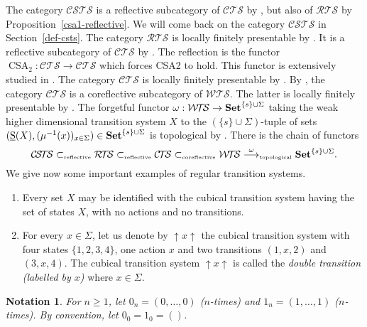 \documentclass[a4paper,12pt]{amsart}
\newtheorem{nota}[thm]{Notation}
\begin{document}
The category ${\mathcal{C\!S\!T\!S}}$ is a reflective subcategory of ${\mathcal{C\!T\!S}}$ by
\cite[Proposition~7.2]{cubicalhdts}, but also of ${\mathcal{R\!T\!S}}$ by
Proposition~\ref{csa1-reflective}. We will come back on the category
${\mathcal{C\!S\!T\!S}}$ in Section~\ref{def-csts}. The category ${\mathcal{R\!T\!S}}$ is locally
finitely presentable by \cite[Proposition~4.5]{csts}. It is a
reflective subcategory of ${\mathcal{C\!T\!S}}$ by \cite[Proposition~4.4]{csts}. The
reflection is the functor $\operatorname{CSA}_2:{\mathcal{C\!T\!S}}\to {\mathcal{C\!T\!S}}$ which forces CSA2 to
hold. This functor is extensively studied in
\cite[Section~4]{csts}. The category ${\mathcal{C\!T\!S}}$ is locally finitely
presentable by \cite[Corollary~3.15]{cubicalhdts}. By
\cite[Corollary~3.15]{cubicalhdts}, the category ${\mathcal{C\!T\!S}}$ is a
coreflective subcategory of ${\mathcal{W\!T\!S}}$. The latter is locally finitely
presentable by \cite[Theorem~3.4]{hdts}. The forgetful functor
$\omega:{\mathcal{W\!T\!S}} \to {{{\rm{\mathbf{{Set}}}}}}^{\{s\}\cup \Sigma}$ taking the weak higher
dimensional transition system $X$ to the $(\{s\}\cup \Sigma)$-tuple of
sets $(\operatorname{\underline{S}}(X),(\mu^{-1}(x))_{x\in \Sigma}) \in {{{\rm{\mathbf{{Set}}}}}}^{\{s\}\cup
  \Sigma}$ is topological by \cite[Theorem~3.4]{hdts}.  There is the
chain of functors
\[{\mathcal{C\!S\!T\!S}} \subset_{\hbox{\tiny reflective}} {\mathcal{R\!T\!S}} \subset_{\hbox{\tiny reflective}} {\mathcal{C\!T\!S}} \subset_{\hbox{\tiny coreflective}} {\mathcal{W\!T\!S}} \stackrel{\omega}\longrightarrow_{\hbox{\tiny topological}} {{{\rm{\mathbf{{Set}}}}}}^{\{s\}\cup \Sigma}.\]
We give now some important examples of regular transition systems.

\begin{enumerate}
\item Every set $X$ may be identified with the cubical transition
  system having the set of states $X$, with no actions and no
  transitions.
\item For every $x\in \Sigma$, let us denote by ${\uparrow\!\!{{x}}\!\!\uparrow}$ the cubical
  transition system with four states $\{1,2,3,4\}$, one action $x$ and
  two transitions $(1,x,2)$ and $(3,x,4)$. The cubical transition
  system ${\uparrow\!\!{{x}}\!\!\uparrow}$ is called the \emph{double transition (labelled by
    $x$)} where $x\in \Sigma$.
\end{enumerate}

\begin{nota} For $n{\geqslant} 1$, let $0_n = (0,\dots,0)$ ($n$-times) and
  $1_n = (1,\dots,1)$ ($n$-times). By convention, let
  $0_0=1_0=()$. \end{nota}
\end{document}
